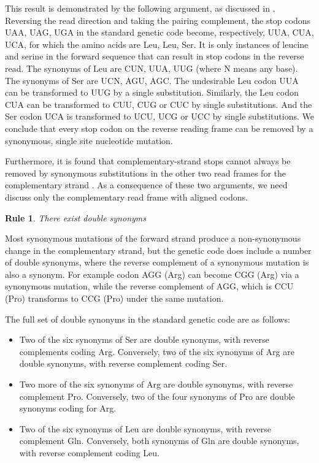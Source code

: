 \documentclass[unnumsec,webpdf,contemporary,large]{oup-authoring-template}%
\theoremstyle{thmstyleone}%
\newtheorem{ambirule}{Rule}%
\theoremstyle{thmstyletwo}%
\theoremstyle{thmstylethree}%
\begin{document}
This result is demonstrated by the following argument, as discussed in \cite{DeR+19}. Reversing the read direction
and taking the pairing complement, the stop codons UAA, UAG, UGA in the standard genetic code become, respectively,
UUA, CUA, UCA, for which the amino acids are Leu, Leu, Ser. It is only instances of leucine and
serine in the forward sequence that can result in stop codons in the reverse read.
The synonyms of Leu are  CUN,  UUA, UUG (where N means any base).
The synonyms of Ser are UCN, AGU, AGC. The undesirable Leu codon UUA can be transformed
to UUG by a single substitution. Similarly, the Leu codon CUA can be transformed to
CUU, CUG or CUC by single substitutions. And the Ser codon UCA is transformed to UCU, UCG or UCC
by single substitutions. We conclude that every stop codon on the reverse reading frame can be removed
by a synonymous, single site nucleotide mutation.

Furthermore, it is found that complementary-strand stops cannot always be removed by synonymous substitutions
in the other two read frames for the complementary strand \citep[each case requires a separate and somewhat
involved argument, also given in][]{DeR+19}. As a consequence of these two arguments, we need discuss only the
complementary read frame with aligned codons.

\begin{ambirule}There exist double synonyms\label{rule2}
\end{ambirule}

Most synonymous mutations of the forward strand produce a non-synonymous change in the
complementary strand, but the genetic code does include a number of double synonyms,
where the reverse complement of a synonymous mutation is also a synonym.
For example codon AGG (Arg) can become CGG (Arg) via a synonymous mutation,
while the reverse complement of AGG, which is CCU (Pro) transforms to CCG (Pro) under
the same mutation.

The full set of double synonyms in the standard genetic code are as follows:

\begin{itemize}

\item Two of the six synonyms of Ser are double synonyms, with reverse complements coding Arg.
Conversely, two of the six synonyms of Arg are double synonyms, with reverse complement coding Ser.

\item Two more of the six synonyms of Arg are double synonyms, with reverse complement Pro.
Conversely, two of the four synonyms of Pro are double synonyms coding for Arg.

\item Two of the six synonyms of Leu are double synonyms, with reverse complement Gln.
Conversely, both synonyms of Gln are double synonyms, with reverse complement coding Leu.

\end{itemize}
\end{document}

